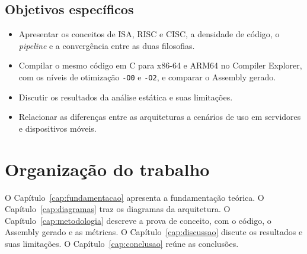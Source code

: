 \subsection{Objetivos específicos}
\begin{itemize}
  \item Apresentar os conceitos de ISA, RISC e CISC, a densidade de código, o \textit{pipeline} e a convergência entre as duas filosofias.
  \item Compilar o mesmo código em C para x86-64 e ARM64 no Compiler Explorer, com os níveis de otimização \texttt{-O0} e \texttt{-O2}, e comparar o Assembly gerado.
  \item Discutir os resultados da análise estática e suas limitações.
  \item Relacionar as diferenças entre as arquiteturas a cenários de uso em servidores e dispositivos móveis.
\end{itemize}

\section{Organização do trabalho}
O Capítulo~\ref{cap:fundamentacao} apresenta a fundamentação teórica. O Capítulo~\ref{cap:diagramas} traz os diagramas da arquitetura. O Capítulo~\ref{cap:metodologia} descreve a prova de conceito, com o código, o Assembly gerado e as métricas. O Capítulo~\ref{cap:discussao} discute os resultados e suas limitações. O Capítulo~\ref{cap:conclusao} reúne as conclusões.
